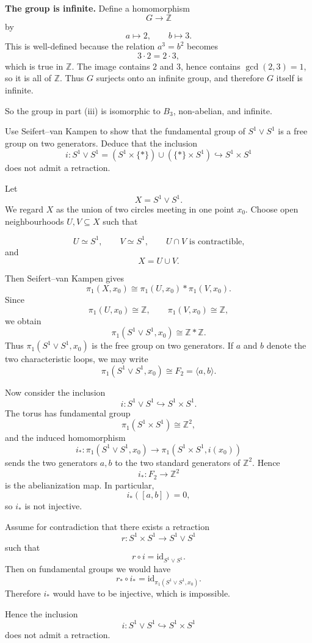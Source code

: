 \begin{solution}
\textbf{The group is infinite.}
Define a homomorphism
\[
G\to \mathbb{Z}
\]
by
\[
a\mapsto 2,\qquad b\mapsto 3.
\]
This is well-defined because the relation \(a^3=b^2\) becomes
\[
3\cdot 2 = 2\cdot 3,
\]
which is true in \(\mathbb{Z}\). The image contains \(2\) and \(3\), hence contains \(\gcd(2,3)=1\), so it is all of \(\mathbb{Z}\). Thus \(G\) surjects onto an infinite group, and therefore \(G\) itself is infinite.

So the group in part (iii) is isomorphic to \(B_3\), non-abelian, and infinite.
\end{solution}

\begin{problem}
Use Seifert--van Kampen to show that the fundamental group of \(S^1\vee S^1\) is a free group on two generators. Deduce that the inclusion
\[
i:S^1\vee S^1=(S^1\times\{*\})\cup(\{*\}\times S^1)\hookrightarrow S^1\times S^1
\]
does not admit a retraction.
\end{problem}

\begin{solution}
Let
\[
X=S^1\vee S^1.
\]
We regard \(X\) as the union of two circles meeting in one point \(x_0\). Choose open neighbourhoods \(U,V\subseteq X\) such that

\[
U\simeq S^1,\qquad V\simeq S^1,\qquad U\cap V \text{ is contractible,}
\]
and
\[
X=U\cup V.
\]

Then Seifert--van Kampen gives
\[
\pi_1(X,x_0)\cong \pi_1(U,x_0)*\pi_1(V,x_0).
\]
Since
\[
\pi_1(U,x_0)\cong \mathbb Z,\qquad \pi_1(V,x_0)\cong \mathbb Z,
\]
we obtain
\[
\pi_1(S^1\vee S^1,x_0)\cong \mathbb Z * \mathbb Z.
\]
Thus \(\pi_1(S^1\vee S^1,x_0)\) is the free group on two generators. If \(a\) and \(b\) denote the two characteristic loops, we may write
\[
\pi_1(S^1\vee S^1,x_0)\cong F_2=\langle a,b\rangle.
\]

Now consider the inclusion
\[
i:S^1\vee S^1\hookrightarrow S^1\times S^1.
\]
The torus has fundamental group
\[
\pi_1(S^1\times S^1)\cong \mathbb Z^2,
\]
and the induced homomorphism
\[
i_*:\pi_1(S^1\vee S^1,x_0)\to \pi_1(S^1\times S^1,i(x_0))
\]
sends the two generators \(a,b\) to the two standard generators of \(\mathbb Z^2\). Hence
\[
i_*:F_2\to \mathbb Z^2
\]
is the abelianization map. In particular,
\[
i_*([a,b])=0,
\]
so \(i_*\) is not injective.

Assume for contradiction that there exists a retraction
\[
r:S^1\times S^1\to S^1\vee S^1
\]
such that
\[
r\circ i=\mathrm{id}_{S^1\vee S^1}.
\]
Then on fundamental groups we would have
\[
r_*\circ i_*=\mathrm{id}_{\pi_1(S^1\vee S^1,x_0)}.
\]
Therefore \(i_*\) would have to be injective, which is impossible.

Hence the inclusion
\[
i:S^1\vee S^1\hookrightarrow S^1\times S^1
\]
does not admit a retraction.

\par
\end{solution}

